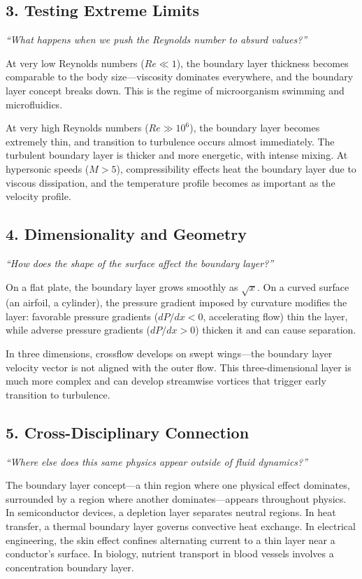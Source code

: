\subsection*{3. Testing Extreme Limits}
\textit{``What happens when we push the Reynolds number to absurd values?''}

At very low Reynolds numbers ($Re \ll 1$), the boundary layer thickness becomes comparable to the body size---viscosity dominates everywhere, and the boundary layer concept breaks down. This is the regime of microorganism swimming and microfluidics.

At very high Reynolds numbers ($Re \gg 10^6$), the boundary layer becomes extremely thin, and transition to turbulence occurs almost immediately. The turbulent boundary layer is thicker and more energetic, with intense mixing. At hypersonic speeds ($M > 5$), compressibility effects heat the boundary layer due to viscous dissipation, and the temperature profile becomes as important as the velocity profile.

\subsection*{4. Dimensionality and Geometry}
\textit{``How does the shape of the surface affect the boundary layer?''}

On a flat plate, the boundary layer grows smoothly as $\sqrt{x}$. On a curved surface (an airfoil, a cylinder), the pressure gradient imposed by curvature modifies the layer: favorable pressure gradients ($dP/dx < 0$, accelerating flow) thin the layer, while adverse pressure gradients ($dP/dx > 0$) thicken it and can cause separation.

In three dimensions, crossflow develops on swept wings---the boundary layer velocity vector is not aligned with the outer flow. This three-dimensional layer is much more complex and can develop streamwise vortices that trigger early transition to turbulence.

\subsection*{5. Cross-Disciplinary Connection}
\textit{``Where else does this same physics appear outside of fluid dynamics?''}

The boundary layer concept---a thin region where one physical effect dominates, surrounded by a region where another dominates---appears throughout physics. In semiconductor devices, a depletion layer separates neutral regions. In heat transfer, a thermal boundary layer governs convective heat exchange. In electrical engineering, the skin effect confines alternating current to a thin layer near a conductor's surface. In biology, nutrient transport in blood vessels involves a concentration boundary layer.

